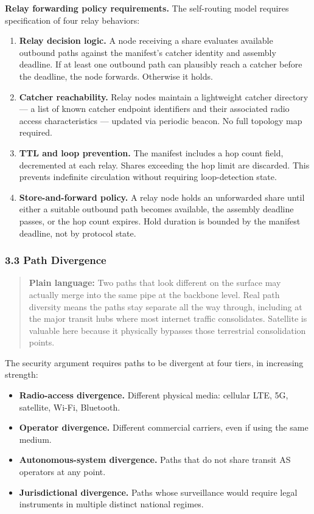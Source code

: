 \documentclass[
  11pt,
]{article}
\providecommand{\tightlist}{%
  \setlength{\itemsep}{0pt}\setlength{\parskip}{0pt}}
\begin{document}
\textbf{Relay forwarding policy requirements.} The self-routing model
requires specification of four relay behaviors:

\begin{enumerate}
\def\labelenumi{\arabic{enumi}.}
\tightlist
\item
  \textbf{Relay decision logic.} A node receiving a share evaluates
  available outbound paths against the manifest's catcher identity and
  assembly deadline. If at least one outbound path can plausibly reach a
  catcher before the deadline, the node forwards. Otherwise it holds.
\item
  \textbf{Catcher reachability.} Relay nodes maintain a lightweight
  catcher directory --- a list of known catcher endpoint identifiers and
  their associated radio access characteristics --- updated via periodic
  beacon. No full topology map required.
\item
  \textbf{TTL and loop prevention.} The manifest includes a hop count
  field, decremented at each relay. Shares exceeding the hop limit are
  discarded. This prevents indefinite circulation without requiring
  loop-detection state.
\item
  \textbf{Store-and-forward policy.} A relay node holds an unforwarded
  share until either a suitable outbound path becomes available, the
  assembly deadline passes, or the hop count expires. Hold duration is
  bounded by the manifest deadline, not by protocol state.
\end{enumerate}

\hypertarget{path-divergence}{%
\subsubsection{3.3 Path Divergence}\label{path-divergence}}

\begin{quote}
\textbf{Plain language:} Two paths that look different on the surface
may actually merge into the same pipe at the backbone level. Real path
diversity means the paths stay separate all the way through, including
at the major transit hubs where most internet traffic consolidates.
Satellite is valuable here because it physically bypasses those
terrestrial consolidation points.
\end{quote}

The security argument requires paths to be divergent at four tiers, in
increasing strength:

\begin{itemize}
\tightlist
\item
  \textbf{Radio-access divergence.} Different physical media: cellular
  LTE, 5G, satellite, Wi-Fi, Bluetooth.
\item
  \textbf{Operator divergence.} Different commercial carriers, even if
  using the same medium.
\item
  \textbf{Autonomous-system divergence.} Paths that do not share transit
  AS operators at any point.
\item
  \textbf{Jurisdictional divergence.} Paths whose surveillance would
  require legal instruments in multiple distinct national regimes.
\end{itemize}
\end{document}
